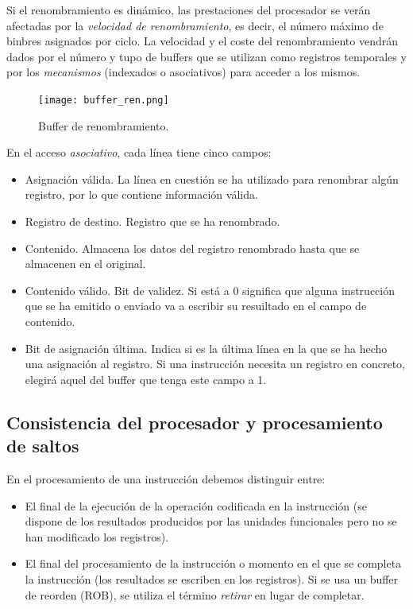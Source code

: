 \documentclass[12pt,spanish]{article}
\begin{document}
Si el renombramiento es dinámico, las prestaciones del procesador se verán afectadas por la \emph{velocidad de renombramiento}, es decir, el número máximo de binbres asignados por ciclo. La velocidad y el coste del renombramiento vendrán dados por el número y tupo de buffers que se utilizan como registros temporales y por los \emph{mecanismos} (indexados o asociativos) para acceder a los mismos.

\begin{figure}[H]
\centering
\texttt{[image: buffer\_ren.png]}
\caption{Buffer de renombramiento.}
\end{figure}

En el acceso \emph{asociativo}, cada línea tiene cinco campos:

\begin{itemize}
	\item Asignación válida. La línea en cuestión se ha utilizado para renombrar algún registro, por lo que contiene información válida.
	\item Registro de destino. Registro que se ha renombrado.
	\item Contenido. Almacena los datos del registro renombrado hasta que se almacenen en el original.	
	\item Contenido válido. Bit de validez. Si está a 0 significa que alguna instrucción que se ha emitido o enviado va a escribir su resuiltado en el campo de contenido.
	\item Bit de asignación última. Indica si es la última línea en la que se ha hecho una asignación al registro. Si una instrucción necesita un registro en concreto, elegirá aquel del buffer que tenga este campo a 1.
\end{itemize}


\subsection{Consistencia del procesador y procesamiento de saltos}


En el procesamiento de una instrucción debemos distinguir entre:

\begin{itemize}
	\item El final de la ejecución de la operación codificada en la instrucción (se dispone de los resultados producidos por las unidades funcionales pero no se han modificado los registros).
	\item El final del procesamiento de la instrucción o momento en el que se completa la instrucción (los resultados se escriben en los registros). Si se usa un buffer de reorden (ROB), se utiliza el término \emph{retirar} en lugar de completar.
\end{itemize}
\end{document}
